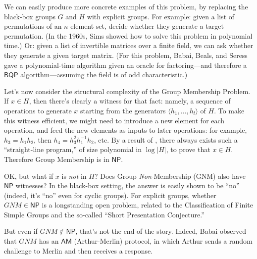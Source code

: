 \documentclass[11pt]{report}
\theoremstyle{plain}
\theoremstyle{definition}
\begin{document}
We can easily produce more concrete examples of this problem, by replacing the black-box groups $G$ and $H$ with explicit groups.  For example: given a list of permutations of an $n$-element set, decide whether they generate a target permutation.  (In the 1960s, Sims \cite{sims} showed how to solve this problem in polynomial time.)  Or: given a list of invertible matrices over a finite field, we can ask whether they generate a given target matrix. (For this problem, Babai, Beals, and Seress \cite{BBS09} gave a polynomial-time algorithm given an oracle for factoring---and therefore a $\mathsf{BQP}$ algorithm---assuming the field is of odd characteristic.)

Let's now consider the structural complexity of the Group Membership Problem.  If $x\in H$, then there's clearly a witness for that fact: namely, a sequence of operations to generate $x$ starting from the generators $\langle h_1, \dots, h_l\rangle$ of $H$.  To make this witness efficient, we might need to introduce a new element for each operation, and feed the new elements as inputs to later operations: for example, $h_3=h_1h_2$, then $h_4=h^2_3h_1^{-1}h_2$, etc.  By a result of \cite{DBLP:conf/focs/BabaiS84}, there always exists such a ``straight-line program,'' of size polynomial in $\log |H|$, to prove that $x\in H$.  Therefore Group Membership is in $\mathsf{NP}$.

OK, but what if $x$ is {\em not} in $H$?  Does Group {\em Non}-Membership (GNM) also have $\mathsf{NP}$ witnesses?  In the black-box setting, the answer is easily shown to be ``no'' (indeed, it's ``no'' even for cyclic groups).  For explicit groups, whether $GNM\in \mathsf{NP}$ is a longstanding open problem, related to the Classification of Finite Simple Groups and the so-called ``Short Presentation Conjecture.''

But even if $GNM\not\in \mathsf{NP}$, that's not the end of the story.  Indeed, Babai observed that $GNM$ has an $\mathsf{AM}$ (Arthur-Merlin) protocol, in which Arthur sends a random challenge to Merlin and then receives a response.
\end{document}
